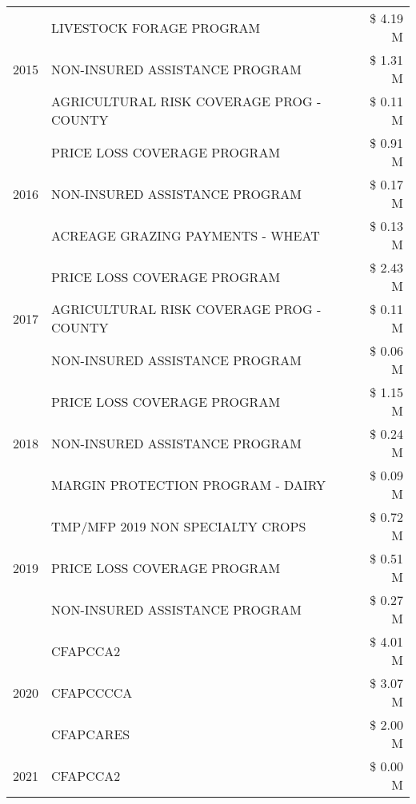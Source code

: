 \begin{tabular}{llr}
\cline{1-3}
\multirow[t]{3}{*}{2015} & LIVESTOCK FORAGE PROGRAM & \$ 4.19 M \\
 & NON-INSURED ASSISTANCE PROGRAM & \$ 1.31 M \\
 & AGRICULTURAL RISK COVERAGE PROG - COUNTY & \$ 0.11 M \\
\cline{1-3}
\multirow[t]{3}{*}{2016} & PRICE LOSS COVERAGE PROGRAM & \$ 0.91 M \\
 & NON-INSURED ASSISTANCE PROGRAM & \$ 0.17 M \\
 & ACREAGE GRAZING PAYMENTS - WHEAT & \$ 0.13 M \\
\cline{1-3}
\multirow[t]{3}{*}{2017} & PRICE LOSS COVERAGE PROGRAM & \$ 2.43 M \\
 & AGRICULTURAL RISK COVERAGE PROG - COUNTY & \$ 0.11 M \\
 & NON-INSURED ASSISTANCE PROGRAM & \$ 0.06 M \\
\cline{1-3}
\multirow[t]{3}{*}{2018} & PRICE LOSS COVERAGE PROGRAM & \$ 1.15 M \\
 & NON-INSURED ASSISTANCE PROGRAM & \$ 0.24 M \\
 & MARGIN PROTECTION PROGRAM - DAIRY & \$ 0.09 M \\
\cline{1-3}
\multirow[t]{3}{*}{2019} & TMP/MFP 2019 NON SPECIALTY CROPS & \$ 0.72 M \\
 & PRICE LOSS COVERAGE PROGRAM & \$ 0.51 M \\
 & NON-INSURED ASSISTANCE PROGRAM & \$ 0.27 M \\
\cline{1-3}
\multirow[t]{3}{*}{2020} & CFAPCCA2 & \$ 4.01 M \\
 & CFAPCCCCA & \$ 3.07 M \\
 & CFAPCARES & \$ 2.00 M \\
\cline{1-3}
2021 & CFAPCCA2 & \$ 0.00 M \\
\cline{1-3}
\bottomrule
\end{tabular}
